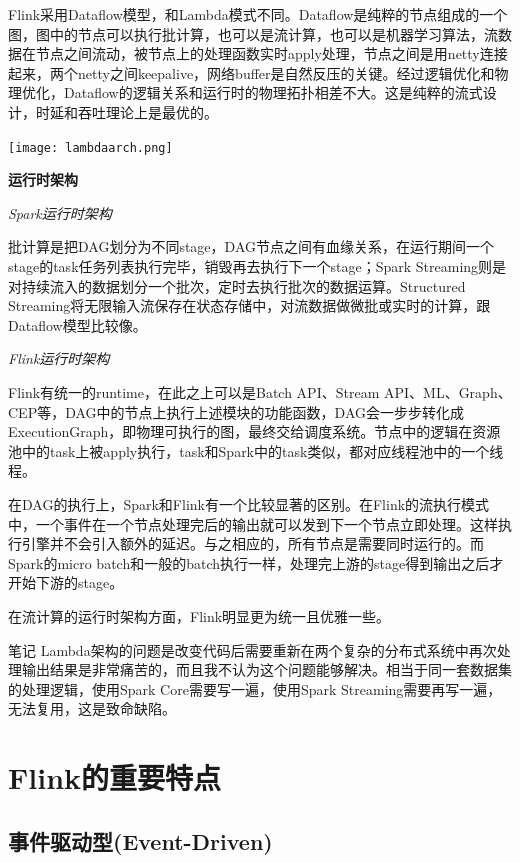 \documentclass[oneside]{ctexbook}
\begin{document}
Flink采用Dataflow模型，和Lambda模式不同。Dataflow是纯粹的节点组成的一个图，图中的节点可以执行批计算，也可以是流计算，也可以是机器学习算法，流数据在节点之间流动，被节点上的处理函数实时apply处理，节点之间是用netty连接起来，两个netty之间keepalive，网络buffer是自然反压的关键。经过逻辑优化和物理优化，Dataflow的逻辑关系和运行时的物理拓扑相差不大。这是纯粹的流式设计，时延和吞吐理论上是最优的。

\noindent \texttt{[image: lambdaarch.png]}

\textbf{运行时架构}

\textit{Spark运行时架构}

批计算是把DAG划分为不同stage，DAG节点之间有血缘关系，在运行期间一个stage的task任务列表执行完毕，销毁再去执行下一个stage；Spark Streaming则是对持续流入的数据划分一个批次，定时去执行批次的数据运算。Structured Streaming将无限输入流保存在状态存储中，对流数据做微批或实时的计算，跟Dataflow模型比较像。

\textit{Flink运行时架构}

Flink有统一的runtime，在此之上可以是Batch API、Stream API、ML、Graph、CEP等，DAG中的节点上执行上述模块的功能函数，DAG会一步步转化成ExecutionGraph，即物理可执行的图，最终交给调度系统。节点中的逻辑在资源池中的task上被apply执行，task和Spark中的task类似，都对应线程池中的一个线程。

在DAG的执行上，Spark和Flink有一个比较显著的区别。在Flink的流执行模式中，一个事件在一个节点处理完后的输出就可以发到下一个节点立即处理。这样执行引擎并不会引入额外的延迟。与之相应的，所有节点是需要同时运行的。而Spark的micro batch和一般的batch执行一样，处理完上游的stage得到输出之后才开始下游的stage。

在流计算的运行时架构方面，Flink明显更为统一且优雅一些。

\begin{bclogo}[logo=\bcinfo, couleurBarre=orange, noborder=true, couleur=white]{笔记}
Lambda架构的问题是改变代码后需要重新在两个复杂的分布式系统中再次处理输出结果是非常痛苦的，而且我不认为这个问题能够解决。相当于同一套数据集的处理逻辑，使用Spark Core需要写一遍，使用Spark Streaming需要再写一遍，无法复用，这是致命缺陷。
\end{bclogo}

\section{Flink的重要特点}

\subsection{事件驱动型(Event-Driven)}
\end{document}
